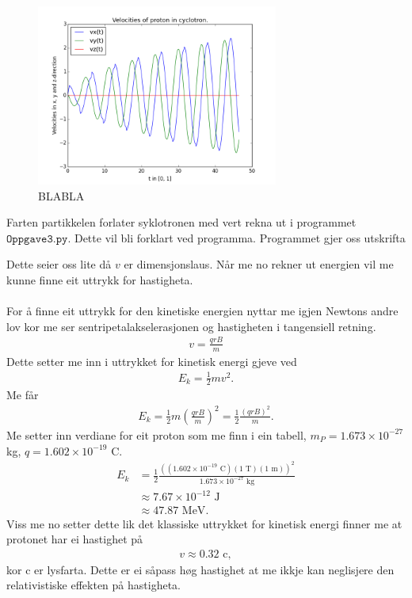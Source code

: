 \documentclass[11pt, a4paper]{article}
\begin{document}
  \begin{figure}[H]
    \centering
    \includegraphics[width=300px]{3A2.png}
    \caption{BLABLA}
  \end{figure}

  Farten partikkelen forlater syklotronen med vert rekna ut i programmet $\texttt{Oppgave3.py}$. Dette vil bli forklart ved programma. %
  Programmet gjer oss utskrifta
  \begin{center}
    
  \end{center}
  Dette seier oss lite då $v$ er dimensjonslaus. Når me no rekner ut energien vil me kunne finne eit uttrykk for hastigheta. \\ \\
  For å finne eit uttrykk for den kinetiske energien nyttar me igjen Newtons andre lov kor me ser sentripetalakselerasjonen og hastigheten i tangensiell retning.
  \begin{align*}
    v = \frac{qrB}{m}
  \end{align*}
  Dette setter me inn i uttrykket for kinetisk energi gjeve ved
  \begin{align*}
    E_k = \frac{1}{2}mv^2.
  \end{align*}
  Me får
  \begin{align*}
    E_k = \frac{1}{2}m\left( \frac{qrB}{m} \right)^2 = \frac{1}{2}\frac{\left( qrB \right)^2}{m}.
  \end{align*}
  Me setter inn verdiane for eit proton som me finn i ein tabell, $m_P = 1.673\times10^{-27}$ kg, $q = 1.602\times10^{-19}$ C.
  \begin{align*}
    E_k &= \frac{1}{2}\frac{\left( (1.602\times10^{-19}\text{ C})(1 \text{ T})(1\text{ m}) \right)^2}{1.673\times10^{-27}\text{ kg}} \\
    &\approx 7.67\times10^{-12}\text{ J} \\
    &\approx 47.87 \text{ MeV}.
  \end{align*}
  Viss me no setter dette lik det klassiske uttrykket for kinetisk energi finner me at protonet har ei hastighet på 
  \begin{align*}
    v \approx 0.32\text{ c},
  \end{align*}
  kor c er lysfarta. Dette er ei såpass høg hastighet at me ikkje kan neglisjere den relativistiske effekten på hastigheta. \\ \\
\end{document}
